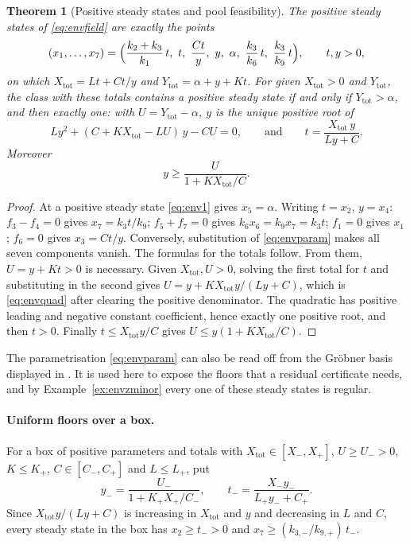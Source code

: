\documentclass[11pt,a4paper]{article}
\theoremstyle{plain}
\newtheorem{theorem}{Theorem}[section]
\theoremstyle{definition}
\theoremstyle{remark}
\newcommand{\Xtot}{X_{\mathrm{tot}}}
\newcommand{\Ytot}{Y_{\mathrm{tot}}}
\begin{document}
\begin{theorem}[Positive steady states and pool feasibility]\label{thm:envpool}
The positive steady states of \eqref{eq:envfield} are exactly the points
\begin{equation}\label{eq:envparam}
  (x_1,\dots,x_7)=\Bigl(\frac{k_2+k_3}{k_1}\,t,\ t,\ \frac{Ct}{y},\ y,\ \alpha,\ \frac{k_3}{k_6}\,t,\ \frac{k_3}{k_9}\,t\Bigr),\qquad t,y>0,
\end{equation}
on which $\Xtot=Lt+Ct/y$ and $\Ytot=\alpha+y+Kt$. For given $\Xtot>0$ and $\Ytot$, the class with these totals contains a positive steady state if and only if $\Ytot>\alpha$, and then exactly one: with $U=\Ytot-\alpha$, $y$ is the unique positive root of
\begin{equation}\label{eq:envquad}
  Ly^2+(C+K\Xtot-LU)\,y-CU=0,\qquad\text{and}\qquad t=\frac{\Xtot\,y}{Ly+C}.
\end{equation}
Moreover
\begin{equation}\label{eq:yfloor}
  y\ge\frac{U}{1+K\Xtot/C}.
\end{equation}
\end{theorem}
\begin{proof}
At a positive steady state \eqref{eq:env1} gives $x_5=\alpha$. Writing $t=x_2$, $y=x_4$: $f_3-f_4=0$ gives $x_7=k_3t/k_9$; $f_5+f_7=0$ gives $k_6x_6=k_9x_7=k_3t$; $f_1=0$ gives $x_1$; $f_6=0$ gives $x_3=Ct/y$. Conversely, substitution of \eqref{eq:envparam} makes all seven components vanish. The formulas for the totals follow. From them, $U=y+Kt>0$ is necessary. Given $\Xtot,U>0$, solving the first total for $t$ and substituting in the second gives $U=y+K\Xtot y/(Ly+C)$, which is \eqref{eq:envquad} after clearing the positive denominator. The quadratic has positive leading and negative constant coefficient, hence exactly one positive root, and then $t>0$. Finally $t\le\Xtot y/C$ gives $U\le y(1+K\Xtot/C)$.
\end{proof}

The parametrisation \eqref{eq:envparam} can also be read off from the Gr\"obner basis displayed in \cite[Example~3.15]{acr}. It is used here to expose the floors that a residual certificate needs, and by Example~\ref{ex:envzminor} every one of these steady states is regular.

\paragraph{Uniform floors over a box.}
For a box of positive parameters and totals with $\Xtot\in[X_-,X_+]$, $U\ge U_->0$, $K\le K_+$, $C\in[C_-,C_+]$ and $L\le L_+$, put
\[
  y_-=\frac{U_-}{1+K_+X_+/C_-},\qquad t_-=\frac{X_-y_-}{L_+y_-+C_+}.
\]
Since $\Xtot y/(Ly+C)$ is increasing in $\Xtot$ and $y$ and decreasing in $L$ and $C$, every steady state in the box has $x_2\ge t_->0$ and $x_7\ge(k_{3,-}/k_{9,+})\,t_-$.
\end{document}

